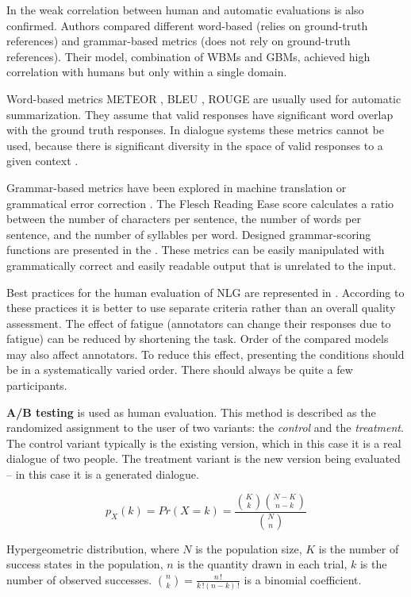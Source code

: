 In \cite{novikova2017we} the weak correlation between human and automatic evaluations is also confirmed. Authors compared different word-based (relies on ground-truth references) and grammar-based metrics (does not rely on ground-truth references). Their model, combination of WBMs and GBMs, achieved high correlation with humans but only within a single domain.

Word-based metrics METEOR \cite{banerjee2005meteor}, BLEU \cite{papineni2002bleu}, ROUGE \cite{lin2004rouge} are usually used for automatic summarization. They assume that valid responses have significant word overlap with the ground truth responses. In dialogue systems these metrics cannot be used, because there is significant diversity in the space of valid responses to a given context \cite{liu2016not}.

Grammar-based metrics have been explored in machine translation \cite{gimenez2008smorgasbord} or grammatical error correction \cite{napoles2016there}. The Flesch Reading Ease score \cite{flesch1979write} calculates a ratio between the number of characters per sentence, the number of words per sentence, and the number of syllables per word. Designed grammar-scoring functions are presented in the \cite{napoles2016there}. These metrics can be easily manipulated
with grammatically correct and easily readable output that is unrelated to the input.

Best practices for the human evaluation of NLG are represented in \cite{van2019best}. According to these practices it is better to use separate criteria rather than an overall quality assessment. The effect of fatigue (annotators can change their responses due to fatigue) can be reduced by shortening the task. Order of the compared models may also affect annotators. To reduce this effect, presenting the conditions should be in a systematically varied order. There should always be quite a few participants.

\textbf{A/B testing} \cite{kohavi2017online} is used as human evaluation. This method is described as the randomized assignment to the user of two variants: the \textit{control} and the \textit{treatment}. The control variant typically is the existing version, which in this case it is a real dialogue of two people. The treatment variant is the new version being evaluated -- in this case it is a generated dialogue. 

\begin{eqfloat}
\begin{equation} \label{eq:hypergeometric_distribution}
p_X(k) = Pr(X=k) = \frac{\binom{K}{k} \binom{N-K}{n-k}}{\binom{N}{n}}
\end{equation}
\caption{Hypergeometric distribution, where $N$ is the population size, $K$ is the number of success states in the population, $n$ is the quantity drawn in each trial, $k$ is the number of observed successes. $\binom{n}{k} = \frac{n\,!}{k\,!(n-k)\,!}$ is a binomial coefficient.}
\end{eqfloat}

